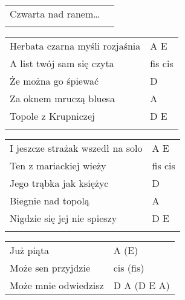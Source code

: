 \documentclass[a5paper]{article}
\begin{document}
\noindent
\begin{tabular}{@{}p{7cm}p{3cm}@{}}
Czwarta nad ranem… \\ \\
\end{tabular}

\noindent
\begin{tabular}{@{}p{8cm}p{3cm}@{}}
Herbata czarna myśli rozjaśnia & A E \\
A list twój sam się czyta & fis cis \\
Że można go śpiewać & D \\
Za oknem mruczą bluesa & A \\
Topole z Krupniczej & D E \\ \\
\end{tabular}

\noindent
\begin{tabular}{@{}p{8cm}p{3cm}@{}}
I jeszcze strażak wszedł na solo & A E \\
Ten z mariackiej wieży & fis cis \\
Jego trąbka jak księżyc & D \\
Biegnie nad topolą & A \\
Nigdzie się jej nie spieszy & D E \\ \\
\end{tabular}

\noindent
\begin{tabular}{@{}p{7cm}p{3cm}@{}}
Już piąta & A (E) \\
Może sen przyjdzie & cis (fis) \\
Może mnie odwiedzisz & D A (D E A)
\end{tabular}
\end{document}
